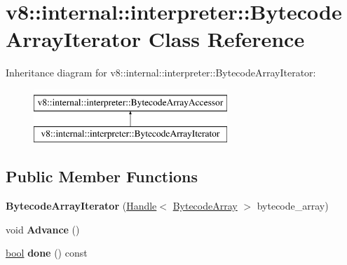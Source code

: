 \hypertarget{classv8_1_1internal_1_1interpreter_1_1BytecodeArrayIterator}{}\section{v8\+:\+:internal\+:\+:interpreter\+:\+:Bytecode\+Array\+Iterator Class Reference}
\label{classv8_1_1internal_1_1interpreter_1_1BytecodeArrayIterator}
Inheritance diagram for v8\+:\+:internal\+:\+:interpreter\+:\+:Bytecode\+Array\+Iterator\+:\begin{figure}[H]
\begin{center}
\leavevmode
\includegraphics[height=2.000000cm]{classv8_1_1internal_1_1interpreter_1_1BytecodeArrayIterator}
\end{center}
\end{figure}
\subsection*{Public Member Functions}
\begin{DoxyCompactItemize}
\item 
\mbox{\label{classv8_1_1internal_1_1interpreter_1_1BytecodeArrayIterator_a204aeb610f10582f2a80f87ec8a0ddbd}} 
{\bfseries Bytecode\+Array\+Iterator} (\mbox{\hyperlink{classv8_1_1internal_1_1Handle}{Handle}}$<$ \mbox{\hyperlink{classv8_1_1internal_1_1BytecodeArray}{Bytecode\+Array}} $>$ bytecode\+\_\+array)
\item 
\mbox{\label{classv8_1_1internal_1_1interpreter_1_1BytecodeArrayIterator_a5ad6a109b5185076627b9cf3f0e3dd3b}} 
void {\bfseries Advance} ()
\item 
\mbox{\label{classv8_1_1internal_1_1interpreter_1_1BytecodeArrayIterator_a063702019be22ca2c9aed41bfcea1ae5}} 
\mbox{\hyperlink{classbool}{bool}} {\bfseries done} () const
\end{DoxyCompactItemize}


